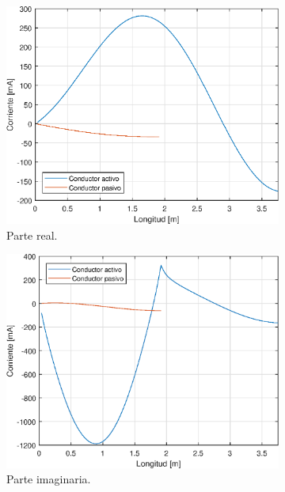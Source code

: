 \begin{figure}[H]
	\begin{subfigure}{0.5\textwidth}
		\includegraphics[scale=0.6]{imagenes/i_real_80_tierra.eps}
		\caption{Parte real.}
		\label{fig.i_real_80_tierra}
	\end{subfigure}
	\quad
	\begin{subfigure}{0.5\textwidth}
		\includegraphics[scale=0.6]{imagenes/i_imag_80_tierra.eps}
		\caption{Parte imaginaria.}
		\label{fig.i_imag_80_tierra}
	\end{subfigure}
	\quad
	\begin{subfigure}{0.5\textwidth}

\end{subfigure}
\end{figure}

